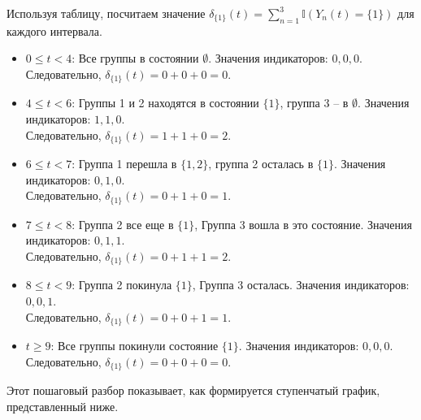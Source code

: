 \documentclass[12pt]{article}
\theoremstyle{plain}
\theoremstyle{definition}
\theoremstyle{remark}
\begin{document}
Используя таблицу, посчитаем значение $\delta_{\{1\}}(t) = \sum_{n=1}^{3} \mathbb{I}(Y_n(t)=\{1\})$ для каждого интервала.
\begin{itemize}
    \item $0 \le t < 4$: Все группы в состоянии $\emptyset$. Значения индикаторов: $0, 0, 0$. \\
    Следовательно, $\delta_{\{1\}}(t) = 0 + 0 + 0 = 0$.

    \item $4 \le t < 6$: Группы 1 и 2 находятся в состоянии $\{1\}$, группа 3 -- в $\emptyset$. Значения индикаторов: $1, 1, 0$. \\
    Следовательно, $\delta_{\{1\}}(t) = 1 + 1 + 0 = 2$.

    \item $6 \le t < 7$: Группа 1 перешла в $\{1, 2\}$, группа 2 осталась в $\{1\}$. Значения индикаторов: $0, 1, 0$. \\
    Следовательно, $\delta_{\{1\}}(t) = 0 + 1 + 0 = 1$.

    \item $7 \le t < 8$: Группа 2 все еще в $\{1\}$, Группа 3 вошла в это состояние. Значения индикаторов: $0, 1, 1$. \\
    Следовательно, $\delta_{\{1\}}(t) = 0 + 1 + 1 = 2$.

    \item $8 \le t < 9$: Группа 2 покинула $\{1\}$, Группа 3 осталась. Значения индикаторов: $0, 0, 1$. \\
    Следовательно, $\delta_{\{1\}}(t) = 0 + 0 + 1 = 1$.

    \item $t \ge 9$: Все группы покинули состояние $\{1\}$. Значения индикаторов: $0, 0, 0$. \\
    Следовательно, $\delta_{\{1\}}(t) = 0 + 0 + 0 = 0$.
\end{itemize}

Этот пошаговый разбор показывает, как формируется ступенчатый график, представленный ниже.
\end{document}
